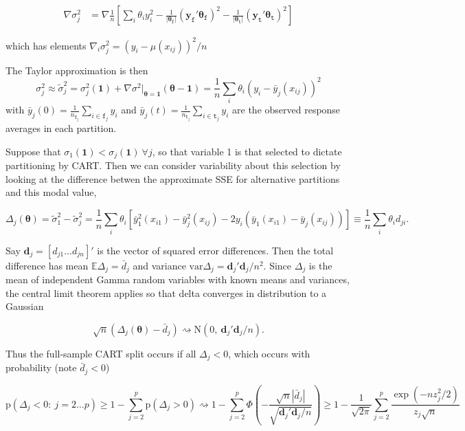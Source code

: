 \documentclass{article}
\begin{document}
\begin{align}
\nabla \sigma^2_j & = \nabla  \frac{1}{n}\left[\sum_i \theta_iy_i^2 - \frac{1}{\left|\boldsymbol{\theta}_{\texttt{f}}\right|}\left(\mathbf{y}_{\texttt{f}}'\boldsymbol{\theta}_{\texttt{f}}\right)^2
- \frac{1}{\left|\boldsymbol{\theta}_{\texttt{t}}\right|}\left(\mathbf{y}_{\texttt{t}}'\boldsymbol{\theta}_{\texttt{t}}\right)^2\right]
\end{align}

which has elements $ \nabla_{i} \sigma^2_j = \left(y_i -
\mu(x_{ij})\right)^2/n $

The Taylor approximation is then \[
\sigma^2_j \approx \tilde\sigma^2_j  = \sigma^2_j(\boldsymbol{1}) + \nabla \sigma^2\big |_{\boldsymbol{\theta}=\mathbf{1}} (\boldsymbol{\theta} - \boldsymbol{1}) =  \frac{1}{n}\sum_i \theta_i \left(y_i - \bar{y}_j(x_{ij})\right)^2
\] with
$\bar y_j(0) = \frac{1}{n_{\texttt{f}_j}}\sum_{i \in \texttt{f}_j}y_i$
and
$\bar y_j(t) = \frac{1}{n_{\texttt{t}_j}}\sum_{i \in \texttt{t}_j}y_i$
are the observed response averages in each partition.

    Suppose that
$\sigma_1(\boldsymbol{1}) < \sigma_j(\boldsymbol{1})~\forall j$, so that
variable 1 is that selected to dictate partitioning by CART. Then we can
consider variability about this selection by looking at the difference
betwen the approximate SSE for alternative partitions and this modal
value,

\[
\Delta_j(\boldsymbol{\theta}) = \tilde\sigma_1^2 - \tilde\sigma_j^2 =  \frac{1}{n}\sum_i \theta_i
\left[\bar{y}_1^2(x_{i1})-\bar{y}^2_j(x_{ij}) - 2y_i\left(\bar{y}_1(x_{i1})-\bar{y}_j(x_{ij})\right)\right] \equiv \frac{1}{n}\sum_i \theta_i d_{ji}.
\]

Say $\mathbf{d}_j = [d_{j1}\ldots d_{jn}]'$ is the vector of squared
error differences. Then the total difference has mean
$\mathbb{E}\Delta_j  = \bar{d}_j$ and variance
$\mathrm{var}\Delta_j =  \mathbf{d}_j'\mathbf{d}_j/n^2$. Since
$\Delta_j$ is the mean of independent Gamma random variables with known
means and variances, the central limit theorem applies so that delta
converges in distribution to a Gaussian

\[
\sqrt{n}(\Delta_j(\boldsymbol{\theta}) -\bar{d}_j)\rightsquigarrow \mathrm{N}(0,~\mathbf{d}_j'\mathbf{d}_j/n ).
\]

Thus the full-sample CART split occurs if all $\Delta_j< 0 $, which
occurs with probability (note $\bar d_j < 0$)

\[
\mathrm{p}\left(\Delta_j< 0 :~ j = 2\dots p \right) \geq 1 - \sum_{j=2}^p \mathrm{p}( \Delta_j > 0 )\rightsquigarrow 1 
 - \sum_{j=2}^p \Phi\left( -\frac{\sqrt{n}\left|\bar{d}_j\right|}{\sqrt{\mathbf{d}_j'\mathbf{d}_j/n}}\right) 
 \geq 1 -  \frac{1}{\sqrt{2\pi}} \sum_{j=2}^p \frac{\exp(-n z^2_j/2)}{z_j\sqrt{n}} 
\]
\end{document}
